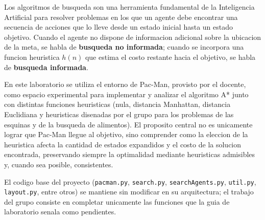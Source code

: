 Los algoritmos de busqueda son una herramienta fundamental de la Inteligencia Artificial para
resolver problemas en los que un agente debe encontrar una secuencia de acciones que lo lleve
desde un estado inicial hasta un estado objetivo. Cuando el agente no dispone de informacion
adicional sobre la ubicacion de la meta, se habla de \textbf{busqueda no informada}; cuando se
incorpora una funcion heuristica $h(n)$ que estima el costo restante hacia el objetivo, se habla
de \textbf{busqueda informada}.

En este laboratorio se utiliza el entorno de Pac-Man, provisto por el docente, como espacio
experimental para implementar y analizar el algoritmo A* junto con distintas funciones
heuristicas (nula, distancia Manhattan, distancia Euclidiana y heuristicas disenadas por el
grupo para los problemas de las esquinas y de la busqueda de alimentos). El proposito central no
es unicamente lograr que Pac-Man llegue al objetivo, sino comprender como la eleccion de la
heuristica afecta la cantidad de estados expandidos y el costo de la solucion encontrada,
preservando siempre la optimalidad mediante heuristicas admisibles y, cuando sea posible, consistentes.

El codigo base del proyecto (\texttt{pacman.py}, \texttt{search.py}, \texttt{searchAgents.py},
\texttt{util.py}, \texttt{layout.py}, entre otros) se mantiene sin modificar en su arquitectura;
el trabajo del grupo consiste en completar unicamente las funciones que la guia de laboratorio
senala como pendientes.
